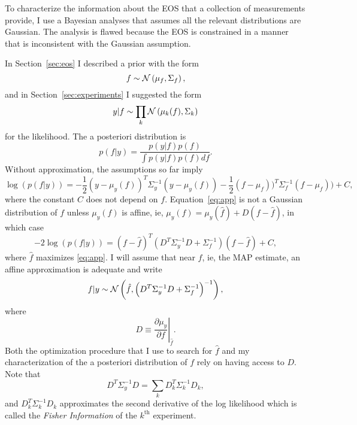\documentclass[11pt]{article}
\newcommand{\normal}[2]{{\cal N}\left( #1,#2 \right)}
\newcommand{\normalexp}[3]{ -\frac{1}{2}
      (#1 - #2)^T #3^{-1} (#1 - #2) }
\newcommand{\eos}{f}
\newcommand{\data}{y}
\begin{document}
To characterize the information about the EOS that a collection of
measurements provide, I use a Bayesian analyses that assumes all the
relevant distributions are Gaussian.  The analysis is flawed because
the EOS is constrained in a manner that is inconsistent with the
Gaussian assumption.

In Section~\ref{sec:eos} I described a prior with the form
\begin{equation*}
  \eos \sim \normal{\mu_\eos}{\Sigma_\eos},
\end{equation*}
and in Section~\ref{sec:experiments} I suggested the form
\begin{equation*}
  \data | \eos \sim \prod_k \normal{\mu_k(f)}{\Sigma_k}
\end{equation*}
for the likelihood.  The a posteriori distribution is
\begin{equation*}
  p(\eos|\data) = \frac{p(\data|\eos) p(\eos)}{\int p(\data|\eos)
    p(\eos) d \eos}.
\end{equation*}
Without approximation, the assumptions so far imply
\begin{equation}
  \label{eq:app}
  \log(p(\eos|\data)) = \normalexp{\data}{\mu_\data(\eos)}{\Sigma_\data}
\normalexp{\eos}{\mu_\eos)}{\Sigma_\eos} + C,
\end{equation}
where the constant $C$ does not depend on $f$.
Equation~\eqref{eq:app} is not a Gaussian distribution of $\eos$
unless $\mu_\data(\eos)$ is affine, ie,
$\mu_\data(\eos) = \mu_\data(\hat \eos) + D(\eos - \hat \eos)$, in
which case
\begin{equation*}
  -2\log(p(\eos|\data)) = \left(\eos - \hat \eos \right)^T
  \left( D^T \Sigma_\data^{-1} D + \Sigma_\eos^{-1} \right)
  \left(\eos - \hat \eos \right) + C,
\end{equation*}
where $\hat \eos$ maximizes \eqref{eq:app}.  I will assume that near
$\hat \eos$, ie, the MAP estimate, an affine approximation is adequate
and write
\begin{equation}
  \label{eq:normal_app}
  \eos|\data \sim \normal{\hat \eos}{\left( D^T \Sigma_\data^{-1} D + \Sigma_\eos^{-1} \right)^{-1}},
\end{equation}
where
\begin{equation*}
  D \equiv \left. \frac{\partial\mu_\data}{\partial \eos}
  \right|_{\hat \eos} .
\end{equation*}
Both the optimization procedure that I use to search for $\hat \eos$
and my characterization of the a posteriori distribution of $\eos$
rely on having access to $D$.  Note that
\begin{equation}
  \label{eq:Fisher_I}
   D^T \Sigma_\data^{-1} D = \sum_k D_k^T \Sigma_k^{-1} D_k,
\end{equation}
and $D_k^T \Sigma_k^{-1} D_k$ approximates the second derivative of
the log likelihood which is called the \emph{Fisher Information} of
the $k^{\text{th}}$ experiment.
\end{document}
